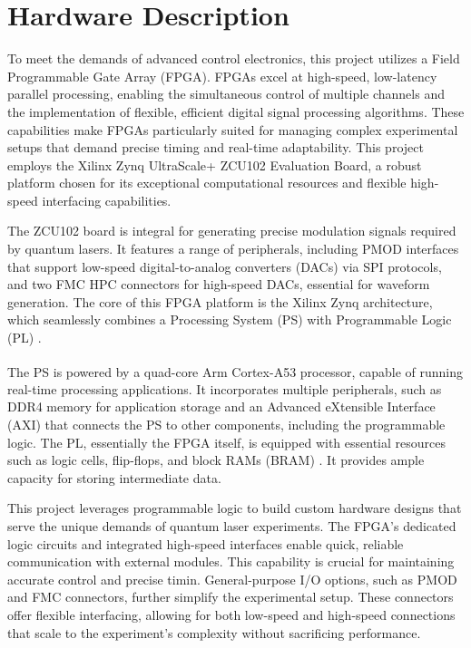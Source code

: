 \section{Hardware Description}

To meet the demands of advanced control electronics, this project utilizes a Field Programmable Gate Array (FPGA). FPGAs excel at high-speed, low-latency parallel processing, enabling the simultaneous control of multiple channels and the implementation of flexible, efficient digital signal processing algorithms. These capabilities make FPGAs particularly suited for managing complex experimental setups that demand precise timing and real-time adaptability. This project employs the Xilinx Zynq UltraScale+ ZCU102 Evaluation Board, a robust platform chosen for its exceptional computational resources and flexible high-speed interfacing capabilities.

The ZCU102 board is integral for generating precise modulation signals required by quantum lasers. It features a range of peripherals, including PMOD interfaces that support low-speed digital-to-analog converters (DACs) via SPI protocols, and two FMC HPC connectors for high-speed DACs, essential for waveform generation. The core of this FPGA platform is the Xilinx Zynq architecture, which seamlessly combines a Processing System (PS) with Programmable Logic (PL) \cite{XilinxUG1182}.

The PS is powered by a quad-core Arm\textsuperscript{\textregistered} Cortex\textsuperscript{\textregistered}-A53 processor, capable of running real-time processing applications. It incorporates multiple peripherals, such as DDR4 memory for application storage and an Advanced eXtensible Interface (AXI) that connects the PS to other components, including the programmable logic. The PL, essentially the FPGA itself, is equipped with essential resources such as logic cells, flip-flops, and block RAMs (BRAM) \cite{XilinxUG1182}. It provides ample capacity for storing intermediate data.

This project leverages programmable logic to build custom hardware designs that serve the unique demands of quantum laser experiments. The FPGA's dedicated logic circuits and integrated high-speed interfaces enable quick, reliable communication with external modules. This capability is crucial for maintaining accurate control and precise timin. General-purpose I/O options, such as PMOD and FMC connectors, further simplify the experimental setup. These connectors offer flexible interfacing, allowing for both low-speed and high-speed connections that scale to the experiment's complexity without sacrificing performance.

